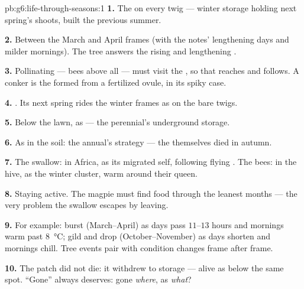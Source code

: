 \begin{solution}{pb:g6:life-through-seasons:1}
\textbf{1.} The  on every twig --- winter storage
holding next spring's shoots, built the previous summer.

\textbf{2.} Between the March and April frames (with the
notes' lengthening days and milder mornings). The tree
answers the rising  and lengthening .

\textbf{3.} Pollinating  --- bees above all --- must
visit the , so that  reaches  and
 follows. A conker is the  formed from a
fertilized ovule, in its spiky  case.

\textbf{4.} . Its next spring rides the winter
frames as  on the bare twigs.

\textbf{5.} Below the lawn, as  --- the perennial's
underground storage.

\textbf{6.} As  in the soil: the annual's strategy ---
the  themselves died in autumn.

\textbf{7.} The swallow: in Africa, as its migrated self,
following flying . The bees: in the hive, as the
winter cluster, warm around their queen.

\textbf{8.} Staying active. The magpie must find food
through the leanest months --- the very problem the swallow
escapes by leaving.

\textbf{9.} For example:  burst (March--April) as days
pass $11$--$13$ hours and mornings warm past
\qty{8}{\degreeCelsius};  gild and drop
(October--November) as days shorten and mornings chill.
Tree events pair with condition changes frame after frame.

\textbf{10.} The patch did not die: it withdrew to storage
--- alive as  below the same spot. ``Gone'' always
deserves: gone \emph{where}, as \emph{what}?


\end{solution}
